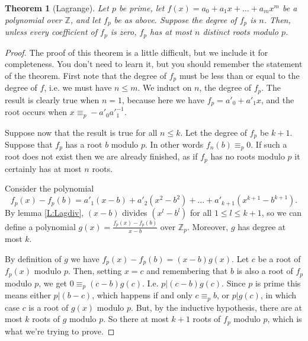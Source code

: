 \documentclass{article}
\theoremstyle{plain}
\newtheorem{theorem}{Theorem}[section]{\bfseries}{\itshape}
\newcommand{\bZ}{\mathbb{Z}}
\begin{document}
\begin{theorem}[Lagrange]
Let $p$ be prime, let $f(x) = a_0 + a_1x +\ldots + a_m x^m$ be a polynomial over $\bZ$, and let $f_p$ be as above. Suppose the degree of $f_p$ is $n$. Then, unless every coefficient of $f_p$ is zero, $f_p$ has at most $n$ distinct roots modulo $p$. 
\end{theorem}
\begin{proof}
The proof of this theorem is a little difficult, but we include it for completeness. You don't need to learn it, but you should remember the statement of the theorem. First note that the degree of $f_p$ must be less than or equal to the degree of $f$, i.e. we must have $n\leq m$. We induct on $n$, the degree of $f_p$. The result is clearly true when $n=1$, because here we have $f_p = a'_0 + a'_1x$, and the root occurs when $x \equiv_p -a'_0a'^{-1}_1$. 

Suppose now that the result is true for all $n\leq k$. Let the degree of $f_p$ be $k+1$. Suppose that $f_p$ has a root $b$ modulo $p$. In other words $f_n(b)\equiv_p 0$. If such a root does not exist then we are already finished, as if $f_p$ has no roots modulo $p$ it certainly has at most $n$ roots. 

Consider the polynomial 
\[f_p(x)- f_p(b) = a'_1(x-b) + a'_2(x^2-b^2) +\ldots + a'_{k+1}(x^{k+1}-b^{k+1}).\]
 By lemma \ref{L:Lagdiv}, $(x-b)$ divides $(x^l-b^l)$ for all $1\leq l\leq k+1$, so we can define a polynomial $g(x)=\frac{f_p(x) - f_p(b)}{x-b}$ over $\bZ_p$. Moreover, $g$ has degree at most $k$. 

By definition of $g$ we have $f_p(x)-f_p(b) = (x-b)g(x)$. Let $c$ be a root of $f_p(x)$ modulo $p$. Then, setting $x=c$ and remembering that $b$ is also a root of $f_p$ modulo $p$, we get $0 \equiv_p (c-b)g(c)$. I.e. $p|(c-b)g(c)$. Since $p$ is prime this means either $p|(b-c)$, which happens if and only $c\equiv_p b$, or $p|g(c)$, in which case $c$ is a root of $g(x)$ modulo $p$. But, by the inductive hypothesis, there are at most $k$ roots of $g$ modulo $p$. So there at most $k+1$ roots of $f_p$ modulo $p$, which is what we're trying to prove.   
\end{proof}
\end{document}
